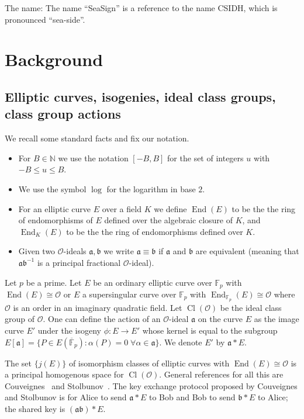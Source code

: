 \documentclass{llncs}
\newcommand{\F}{\mathbb{F}}
\newcommand{\Fpbar}{\overline{\mathbb{F}}_p}
\newcommand{\N}{\mathbb{N}}
\newcommand{\OO}{\mathcal{O}}
\DeclareMathOperator{\End}{End}
\DeclareMathOperator{\Cl}{Cl}
\renewcommand{\a}{\mathfrak{a}}
\renewcommand{\b}{\mathfrak{b}}
\begin{document}
The name: The name ``SeaSign'' is a reference to the name CSIDH, which is pronounced ``sea-side''.




\section{Background}

\subsection{Elliptic curves, isogenies, ideal class groups, class group actions}

We recall some standard facts and fix our notation.

\begin{itemize}
\item For $B \in \N$ we use the notation $[-B,B]$ for the set of integers $u$ with $-B \le u \le B$.
\item We use the symbol $\log$ for the logarithm in base $2$.

\item For an elliptic curve $E$ over a field $K$ we define $\End(E)$ to be the the ring of endomorphisms of $E$ defined over the algebraic closure of $K$, and $\End_K(E)$ to be the the ring of endomorphisms defined over $K$.
\item Given two $\OO$-ideals $\a, \b$ we write $\a \equiv \b$ if $\a$ and $\b$ are equivalent (meaning that $\a \b^{-1}$ is a principal fractional $\OO$-ideal). 
\end{itemize}


Let $p$ be a prime.
Let $E$ be an ordinary elliptic curve over $\F_p$ with $\End(E) \cong \OO$ or $E$ a supersingular curve over $\F_p$ with $\End_{\F_p}(E) \cong \OO$ where $\OO$ is an order in an imaginary quadratic field.
Let $\Cl(\OO )$ be the ideal class group of $\OO$.
One can define the action of an $\OO$-ideal $\a$ on the curve $E$ as the image curve $E'$ under the isogeny $\phi : E \to E'$ whose kernel is equal to the subgroup $E[ \a ] = \{ P \in E( \Fpbar ) : \alpha(P) = 0 \; \forall \alpha \in \a \}$.
We denote $E'$ by $\a * E$.

The set $\{ j(E) \}$ of isomorphism classes of elliptic curves with $\End(E) \cong \OO$ is a principal homogenous space for $\Cl(\OO )$.
General references for all this are Couveignes~\cite{Couv06}
and Stolbunov~\cite{Sto12}.
The key exchange protocol proposed by Couveignes and Stolbunov is for Alice to send $\a * E$ to Bob and Bob to send $\b * E$ to Alice; the shared key is $(\a\b) * E$.
\end{document}
